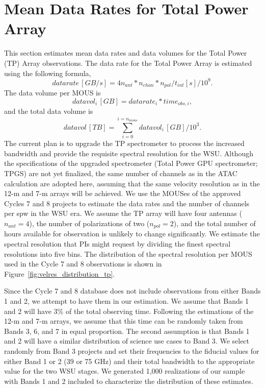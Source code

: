 \appendix
\section{Mean Data Rates for Total Power Array} \label{sec:tp_data_rates}


This section estimates mean data rates and data volumes for the Total Power (TP) Array observations. 
The data rate for the Total Power Array is estimated using the following formula, 
\begin{equation}
  datarate \,  [GB/s] = 4 n_{ant} * n_{chan} * n_{pol} / t_{int} [s] / 10^9. 
\end{equation}
The data volume per MOUS is
\begin{equation}
  datavol_i \,  [GB] = datarate_i * time_{obs,i}, 
\end{equation}
and the total data volume is 
\begin{equation}
  datavol \,  [TB] = \sum^{i=n_{mous}}_{i=0} datavol_i \,  [GB] / 10^3. 
\end{equation}
The current plan is to upgrade the TP spectrometer to process the increased bandwidth and provide the requisite spectral resolution for the WSU. 
Although the specifications of the upgraded spectrometer (Total Power GPU spectrometer; TPGS) are not yet finalized, the same number of channels as in the ATAC calculation are adopted here, assuming that the same velocity resolution as in the 12-m and 7-m arrays will be achieved.
We use the MOUSes of the approved Cycles 7 and 8 projects to estimate the data rates and the number of channels per spw in the WSU era. 
We assume the TP array will have four antennas ($n_{ant} = 4$), the number of polarizations of two ($n_{pol} = 2$), and the total number of hours available for observation is unlikely to change significantly. 
We estimate the spectral resolution that PIs might request by dividing the finest spectral resolutions into five bins. 
The distribution of the spectral resolution per MOUS used in the Cycle 7 and 8 observations is shown in Figure~\ref{fig:velres_distribution_tp}. 


Since the Cycle 7 and 8 database does not include observations from either Bands 1 and 2, we attempt to have them in our estimation. 
We assume that Bands 1 and 2 will have 3\% of the total observing time. 
Following the estimations of the 12-m and 7-m arrays, we assume that this time can be randomly taken from Bands 3, 6, and 7 in equal proportion. 
The second assumption is that Bands 1 and 2 will have a similar distribution of science use cases to Band 3. 
We select randomly from Band 3 projects and set their frequencies to the fiducial values for either Band 1 or 2 (39 or 75 GHz) and their total bandwidth to the appropriate value for the two WSU stages. 
We generated 1,000 realizations of our sample with Bands 1 and 2 included to characterize the distribution of these estimates.


